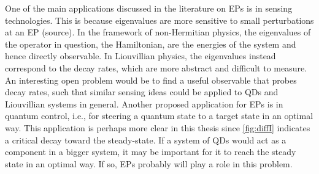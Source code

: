 \documentclass[../main.tex]{subfiles}
\begin{document}
One of the main applications discussed in the literature on EPs is in sensing technologies. This is because eigenvalues are more sensitive to small perturbations at an EP (source). In the framework of non-Hermitian physics, the eigenvalues of the operator in question, the Hamiltonian, are the energies of the system and hence directly observable. In Liouvillian physics, the eigenvalues instead correspond to the decay rates, which are more abstract and difficult to measure. An interesting open problem would be to find a useful observable that probes decay rates, such that similar sensing ideas could be applied to QDs and Liouvillian systems in general. Another proposed application for EPs is in quantum control, i.e., for steering a quantum state to a target state in an optimal way. This application is perhaps more clear in this thesis since \cref{fig:diffI} indicates a critical decay toward the steady-state. If a system of QDs would act as a component in a bigger system, it may be important for it to reach the steady state in an optimal way. If so, EPs probably will play a role in this problem. 

\end{document}
